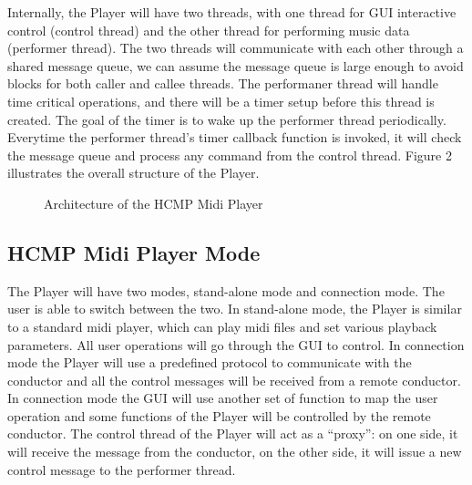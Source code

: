 \documentclass[12pt]{article} %
\begin{document}
Internally, the Player will have two threads, with one thread for
GUI interactive control (control thread) and the other thread for performing music data (performer thread). 
The two threads will communicate with each other through a shared message queue, we can assume the message 
queue is large enough to avoid blocks for both caller and callee threads. The performaner thread
will handle time critical operations, and there will be a timer setup before this thread is created. The goal of the timer is to 
wake up the performer thread periodically. Everytime the performer thread's timer callback function is invoked, 
it will check the message queue and process any command from the control thread. 
Figure 2 illustrates the overall structure of the Player.

\begin{figure}[H] %
\caption{Architecture of the HCMP Midi Player}
\label{fig:speciation}
\end{figure}

\subsection{HCMP Midi Player Mode} %
The Player will have two modes, stand-alone
mode and connection mode. The user is able to switch between the two. In stand-alone mode, 
the Player is similar to a standard midi player, which can play midi  
files and set various playback parameters. All user operations will go through the GUI to control. 
In connection mode the Player will use a predefined protocol to communicate with the conductor and all the 
control messages will be received from a remote conductor. In connection mode the GUI will use another 
set of function to map the user operation and some functions of the Player will be controlled by the 
remote conductor. The control thread 
of the Player will act as a ``proxy'': on one side, 
it will receive the message from the conductor, on the other side, it will issue a new control message
to the performer thread.
\end{document}
